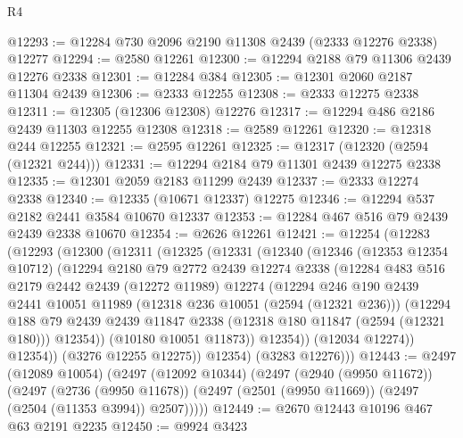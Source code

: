 \begin{lexlean}{R4}
\begin{coremodule}
@12293 := @12284 @730 @2096 @2190 @11308 @2439 (@2333 @12276 @2338) @12277
@12294 := @2580 @12261
@12300 := @12294 @2188 @79 @11306 @2439 @12276 @2338
@12301 := @12284 @384
@12305 := @12301 @2060 @2187 @11304 @2439
@12306 := @2333 @12255
@12308 := @2333 @12275 @2338
@12311 := @12305 (@12306 @12308) @12276
@12317 := @12294 @486 @2186 @2439 @11303 @12255 @12308
@12318 := @2589 @12261
@12320 := @12318 @244 @12255
@12321 := @2595 @12261
@12325 := @12317 (@12320 (@2594 (@12321 @244)))
@12331 := @12294 @2184 @79 @11301 @2439 @12275 @2338
@12335 := @12301 @2059 @2183 @11299 @2439
@12337 := @2333 @12274 @2338
@12340 := @12335 (@10671 @12337) @12275
@12346 := @12294 @537 @2182 @2441 @3584 @10670 @12337
@12353 := @12284 @467 @516 @79 @2439 @2439 @2338 @10670
@12354 := @2626 @12261
@12421 := @12254
    (@12283
      (@12293
        (@12300
          (@12311
            (@12325
              (@12331
                (@12340
                  (@12346
                    (@12353 @12354 @10712)
                    (@12294
                      @2180
                      @79
                      @2772
                      @2439
                      @12274
                      @2338
                      (@12284
                        @483
                        @516
                        @2179
                        @2442
                        @2439
                        (@12272 @11989)
                        @12274
                        (@12294
                          @246
                          @190
                          @2439
                          @2441
                          @10051
                          @11989
                          (@12318 @236 @10051 (@2594 (@12321 @236)))
                          (@12294
                            @188
                            @79
                            @2439
                            @2439
                            @11847
                            @2338
                            (@12318 @180 @11847 (@2594 (@12321 @180)))
                            @12354))
                        (@10180 @10051 @11873))
                      @12354))
                  (@12034 @12274))
                @12354))
            (@3276 @12255 @12275))
          @12354)
        (@3283 @12276)))
@12443 := @2497
    (@12089 @10054)
    (@2497
      (@12092 @10344)
      (@2497
        (@2940 (@9950 @11672))
        (@2497
          (@2736 (@9950 @11678))
          (@2497 (@2501 (@9950 @11669)) (@2497 (@2504 (@11353 @3994)) @2507)))))
@12449 := @2670 @12443 @10196 @467 @63 @2191 @2235
@12450 := @9924 @3423

\end{coremodule}
\end{lexlean}
